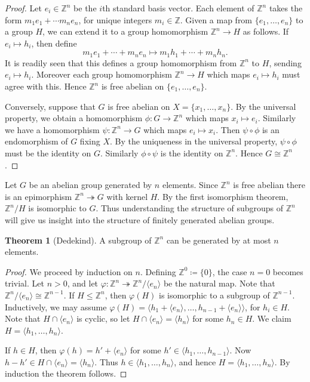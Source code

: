 \documentclass[12pt,a4paper]{article}
\newcommand{\Z}{\mathbb{Z}}
\theoremstyle{definition}
\newtheorem{theorem}{Theorem}[section]
\begin{document}
\begin{proof}
  Let $e_i\in\Z^n$ be the $i$th standard basis vector. Each element of $\Z^n$ takes the form $m_1e_1+\cdots m_ne_n$, for unique integers $m_i\in\Z$. Given a map from $\{e_1,\ldots,e_n\}$ to a group $H$, we can extend it to a group homomorphism $\Z^n\to H$ as follows. If $e_i\mapsto h_i$, then define
  \[ m_1e_1 + \cdots + m_ne_n \mapsto m_1h_1 + \cdots + m_nh_n. \]
  It is readily seen that this defines a group homomorphism from $\Z^n$ to $H$, sending $e_i\mapsto h_i$. Moreover each group homomorphism $\Z^n\to H$ which maps $e_i\mapsto h_i$ must agree with this. Hence $\Z^n$ is free abelian on $\{e_1,\ldots,e_n\}$.

  Conversely, suppose that $G$ is free abelian on $X=\{x_1,\ldots,x_n\}$. By the universal property, we obtain a homomorphism $\phi\colon G\to\Z^n$ which maps $x_i\mapsto e_i$. Similarly we have a homomorphism $\psi\colon\Z^n\to G$ which maps $e_i\mapsto x_i$. Then $\psi\circ\phi$ is an endomorphism of $G$ fixing $X$. By the uniqueness in the universal property, $\psi\circ\phi$ must be the identity on $G$. Similarly $\phi\circ\psi$ is the identity on $\Z^n$. Hence $G\cong\Z^n$.
\end{proof}

Let $G$ be an abelian group generated by $n$ elements. Since $\Z^n$ is free abelian there is an epimorphism $\Z^n\twoheadrightarrow G$ with kernel $H$. By the first isomorphism theorem, $\Z^n/H$ is isomorphic to $G$. Thus understanding the structure of subgroups of $\Z^n$ will give us insight into the structure of finitely generated abelian groups.

\begin{theorem}[Dedekind]
  A subgroup of $\Z^n$ can be generated by at most $n$ elements.
\end{theorem}

\begin{proof}
  We proceed by induction on $n$. Defining $\Z^0\coloneqq\{0\}$, the case $n=0$ becomes trivial. Let $n>0$, and let $\varphi\colon\Z^n\twoheadrightarrow\Z^n/\langle e_n \rangle$ be the natural map. Note that $\Z^n/\langle e_n \rangle\cong\Z^{n-1}$. If $H\leq\Z^n$, then $\varphi(H)$ is isomorphic to a subgroup of $\Z^{n-1}$. Inductively, we may assume $\varphi(H)=\langle h_1 + \langle e_n \rangle, \ldots, h_{n-1} + \langle e_n \rangle \rangle$, for $h_i\in H$. Note that $H\cap\langle e_n \rangle$ is cyclic, so let $H\cap\langle e_n \rangle=\langle h_n \rangle$ for some $h_n\in H$. We claim $H=\langle h_1,\ldots,h_n \rangle$.

  If $h\in H$, then $\varphi(h)=h'+\langle e_n \rangle$ for some $h'\in\langle h_1,\ldots,h_{n-1} \rangle$. Now $h-h'\in H\cap\langle e_n \rangle=\langle h_n \rangle$. Thus $h\in\langle h_1,\ldots,h_n \rangle$, and hence $H=\langle h_1,\ldots,h_n \rangle$. By induction the theorem follows.
\end{proof}
\end{document}

